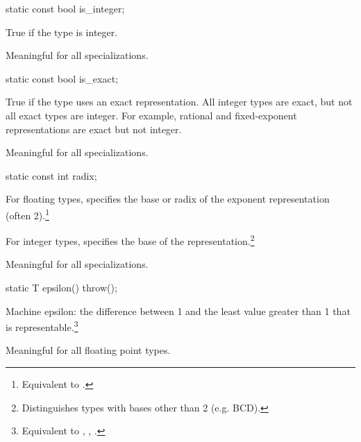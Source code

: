 \begin{itemdecl}
static const bool is_integer;
\end{itemdecl}

\begin{itemdescr}
\pnum
True if the type is integer.

\pnum
Meaningful for all specializations.
\end{itemdescr}

\begin{itemdecl}
static const bool is_exact;
\end{itemdecl}

\begin{itemdescr}
\pnum
True if the type uses an exact representation.
All integer types are exact, but not all exact types are integer.
For example, rational and fixed-exponent representations are exact but not integer.

\pnum
Meaningful for all specializations.
\end{itemdescr}

\begin{itemdecl}
static const int  radix;
\end{itemdecl}

\begin{itemdescr}
\pnum
For floating types, specifies the base or radix of the exponent representation
(often 2).\footnote{Equivalent to .}

\pnum
For integer types, specifies the base of the
representation.\footnote{Distinguishes types with bases other than 2 (e.g.
BCD).}

\pnum
Meaningful for all specializations.
\end{itemdescr}

\begin{itemdecl}
static T epsilon() throw();
\end{itemdecl}

\begin{itemdescr}
\pnum
Machine epsilon:  the difference between 1 and the least value greater than 1
that is representable.\footnote{Equivalent to , , .}

\pnum
Meaningful for all floating point types.
\end{itemdescr}

